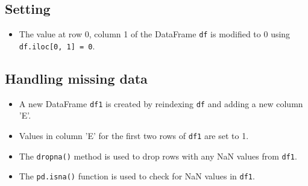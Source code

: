 \begin{code}[h!]
	    
	
	\caption{Boolean Indexing Example}
	
\end{code}

\subsection{Setting}
\begin{itemize}
	\item The value at row 0, column 1 of the DataFrame \texttt{df} is modified to 0 using \texttt{df.iloc[0, 1] = 0}.
\end{itemize}

\begin{code}[h!]
	    
	
	\caption{Setting Example}
	
\end{code}


\subsection{Handling missing data}
\begin{itemize}
	
	\item A new DataFrame \texttt{df1} is created by reindexing \texttt{df} and adding a new column 'E'.
	
	\item Values in column 'E' for the first two rows of \texttt{df1} are set to 1.
	
	\item The \texttt{dropna()} method is used to drop rows with any NaN values from \texttt{df1}.
	
	\item The \texttt{pd.isna()} function is used to check for NaN values in \texttt{df1}.
	
\end{itemize}


\begin{code}[h!]
	    
	
	\caption{Handling Missing Data}
	
\end{code}


